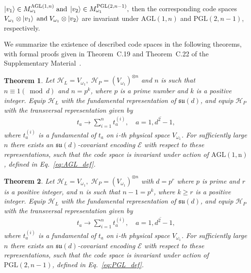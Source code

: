 \documentclass[10pt,twocolumn,superscriptaddress,aps,amsmath,amssymb,citeautoscript,floatfix,prx,longbibliography]{revtex4-2}
\newtheorem{theorem}{Theorem}
\theoremstyle{plain}
\theoremstyle{plain}
\theoremstyle{plain}
\theoremstyle{plain}
\theoremstyle{plain}
\theoremstyle{plain}
\begin{document}
$
    \ket{v_1}\in M_{\omega_1}^{\mathrm{AGL}(1,n)}
    \;\text{and}\;
    \ket{v_2}\in M_{\omega_1}^{\mathrm{PGL}(2,n-1)},
$
then the corresponding code spaces
$
    V_{\omega_1}\otimes \ket{v_1}
    \;\text{and}\;
    V_{\omega_1}\otimes \ket{v_2}
$
are invariant under \(\mathrm{AGL}(1,n)\) and \(\mathrm{PGL}(2,n-1)\), respectively. 

We summarize the existence of described code spaces in the following theorems, with formal proofs given in Theorem~C.19 and Theorem~C.22 of the Supplementary Material~\cite{SuppMat}.

\begin{theorem}\label{thrm:main_2_transitive_covariant_code}
    Let
    $
        \mathcal H_L=V_{\omega_1},\;
        \mathcal H_P=(V_{\omega_1})^{\otimes n}
    $
    and $n$ is such that $n \equiv 1(\bmod d)$ and $n=p^k$, where $p$ is a prime number and $k$ is a positive integer.
    Equip \(\mathcal H_L\) with the fundamental representation of
    \(\mathfrak{su}(d)\), and equip \(\mathcal H_P\) with the transversal
    representation given by
    \begin{equation}
    \begin{gathered}
    t_a \rightarrow \sum_{i=1}^n t_a^{(i)}, \quad a=\overline{1, d^2-1},
    \end{gathered}
    \end{equation} 
    where $t_a^{(i)}$ is a fundamental of $t_a$ on $i$-th physical space $V_{\omega_1}$.
    For sufficiently
    large $n$ there exists an $\mathfrak{su}(d)$-covariant encoding $\mathcal{E}$ with respect to these representations, such that the code space is invariant under action of $\mathrm{AGL(1, n)}$, defined in Eq.~\eqref{eq:AGL_def}. 
\end{theorem}

\begin{theorem}\label{thrm:main_3_transitive_covariant_code}
    Let
    $
        \mathcal H_L=V_{\omega_1},\;
        \mathcal H_P=(V_{\omega_1})^{\otimes n}
    $
    with $d=p^r$ where $p$ is prime and $r$ is a positive integer, 
    and $n$ is such that $n-1=p^k$, where $k \geq r$ is a positive integer. 
    Equip \(\mathcal H_L\) with the fundamental representation of
    \(\mathfrak{su}(d)\), and equip \(\mathcal H_P\) with the transversal
    representation given by
    \begin{equation}
    \begin{gathered}
    t_a \rightarrow \sum_{i=1}^n t_a^{(i)}, \quad a=\overline{1, d^2-1},
    \end{gathered}
    \end{equation} 
    where $t_a^{(i)}$ is a fundamental of $t_a$ on $i$-th physical space $V_{\omega_1}$.
    For sufficiently
    large $n$ there exists an $\mathfrak{su}(d)$-covariant encoding $\mathcal{E}$ with respect to these representations, such that the code space is invariant under action of $\mathrm{PGL}(2, n-1)$, defined in Eq.~\eqref{eq:PGL_def}.
\end{theorem}
\end{document}
